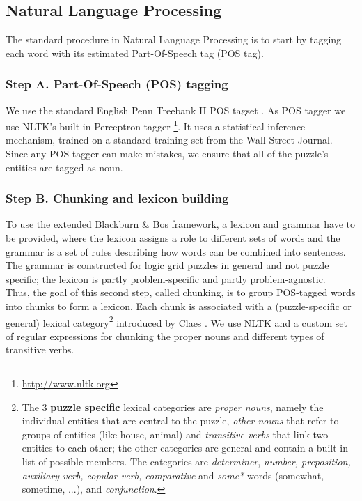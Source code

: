 \subsection{Natural Language Processing} \label{nlp}
The standard procedure in Natural Language Processing is to start by tagging each word with its estimated Part-Of-Speech tag (POS tag). 

\subsubsection*{Step A. Part-Of-Speech (POS) tagging} \label{pos_tagging}
We use the standard English Penn Treebank II POS tagset \cite{marcus1993building}. As POS tagger we use NLTK's built-in Perceptron tagger \footnote{\url{http://www.nltk.org}}. It uses a statistical inference mechanism, trained on a standard training set from the Wall Street Journal. Since any POS-tagger can make mistakes, we ensure that all of the puzzle’s entities are tagged as noun.

\subsubsection*{Step B. Chunking and lexicon building} \label{chunking_lexicon}
To use the extended Blackburn \& Bos framework, a lexicon and grammar have to be provided, where the lexicon assigns a role to different sets of words and the grammar is a set of rules describing how words can be combined into sentences. The grammar is constructed for logic grid puzzles in general and not puzzle specific; the lexicon is partly problem-specific and partly problem-agnostic.\\

Thus, the goal of this second step, called chunking, is to group POS-tagged words into chunks to form a lexicon. Each chunk is associated with a (puzzle-specific or general) lexical category\footnote{The 3 \textbf{puzzle specific} lexical categories are \textit{proper nouns}, namely the individual entities that are central to the puzzle, \textit{other nouns} that refer to groups of entities (like house, animal) and \textit{transitive verbs} that link two entities to each other; the other categories are general and contain a built-in list of possible members. The categories are \textit{determiner},\textit{ number, preposition, auxiliary verb, copular verb, comparative} and \textit{some*}-words (somewhat, sometime, ...), and \textit{conjunction}.} introduced by Claes \cite{msc/Claes17}. We use NLTK and a custom set of regular expressions for chunking the proper nouns and different types of transitive verbs.\\ 

